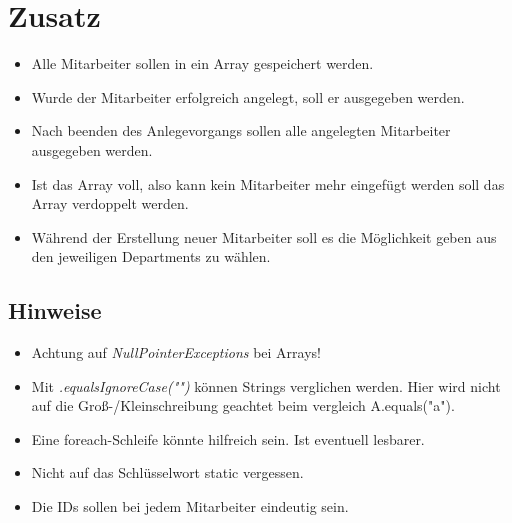 \documentclass[12pt, oneside]{article}   	%
\begin{document}
\newpage
\section{Zusatz}
\begin{itemize}
	\item Alle Mitarbeiter sollen in ein Array gespeichert werden.
	\item Wurde der Mitarbeiter erfolgreich angelegt, soll er ausgegeben werden.
	\item Nach beenden des Anlegevorgangs sollen alle angelegten Mitarbeiter 			ausgegeben werden.
	\item Ist das Array voll, also kann kein Mitarbeiter mehr eingefügt werden soll 			das Array verdoppelt werden.
	\item Während der Erstellung neuer Mitarbeiter soll es die Möglichkeit geben 			aus den jeweiligen Departments zu wählen.
\end{itemize}

\subsection*{Hinweise}
\begin{itemize}
	\item Achtung auf \textit{NullPointerExceptions} bei Arrays!
	\item Mit \textit{.equalsIgnoreCase("")} können Strings verglichen 	werden. Hier wird nicht auf die Groß-/Kleinschreibung geachtet beim vergleich A.equals("a").

	\item Eine foreach-Schleife könnte hilfreich sein. Ist eventuell lesbarer.

	\item Nicht auf das Schlüsselwort static vergessen.

	\item Die IDs sollen bei jedem Mitarbeiter eindeutig sein.\end{itemize}
\end{document}
